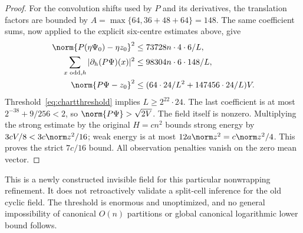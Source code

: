 \begin{proof}
For the convolution shifts used by $P$ and its derivatives, the translation
factors are bounded by $A=\max\{64,36+48+64\}=148$. The same coefficient
sums, now applied to the explicit six-centre estimates above, give
\begin{align*}
 \norm{P(\eta\Psi_0)-\eta z_0}^2
    &\leq73728n\cdot4\cdot6/L,\\
 \sum_{x\text{ odd},h}|\partial_h(P\Psi)(x)|^2
    &\leq98304n\cdot6\cdot148/L,\\
 \norm{P\Psi-z_0}^2
    &\leq(64\cdot24/L^2+147456\cdot24/L)V.
\end{align*}
Threshold~\eqref{eq:chartthreshold} implies $L\geq2^{22}\cdot24$.
The last coefficient is at most $2^{-38}+9/256<2$, so
$\norm{P\Psi}>\sqrt{2V}$. The field itself is nonzero. Multiplying the
strong estimate by the original $H=cn^2$ bounds strong energy by
$3cV/8<3c\norm z^2/16$; weak energy is at most
$12a\norm z^2=c\norm z^2/4$. This proves the strict $7c/16$ bound.
All observation penalties vanish on the zero mean vector.
\end{proof}

This is a newly constructed invisible field for this particular
nonwrapping refinement. It does not retroactively validate a split-cell
inference for the old cyclic field. The threshold is enormous and
unoptimized, and no general impossibility of canonical $O(n)$ partitions
or global canonical logarithmic lower bound follows.


